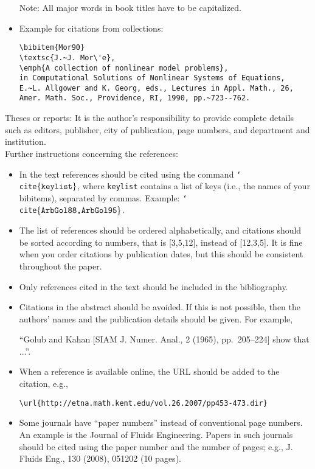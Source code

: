 \documentclass[10pt]{article}
\begin{document}
\begin{itemize}
Note: All major words in book titles have to be capitalized.


\item Example for citations from collections:

\begin{verbatim}
\bibitem{Mor90}
\textsc{J.~J. Mor\'e},
\emph{A collection of nonlinear model problems},
in Computational Solutions of Nonlinear Systems of Equations,
E.~L. Allgower and K. Georg, eds., Lectures in Appl. Math., 26,
Amer. Math. Soc., Providence, RI, 1990, pp.~723--762.
\end{verbatim}

\end{itemize}

\noindent Theses or reports: It is the author's responsibility to provide
complete details such as editors, publisher, city of publication, page
numbers, and department and institution.\\

\noindent Further instructions concerning the references:

\begin{itemize}
\item In the text references should be cited using the command
{\tt \char`\\cite$\{\mbox{\tt keylist}\}$},
where {\tt keylist} contains a list of keys (i.e., the names of your bibitems),
separated by commas. Example:
{\tt \char`\\cite$\{\mbox{\tt ArbGol88,ArbGol95}\}$}.
%
\item The list of references should be ordered alphabetically, and
citations should be sorted according to numbers, that is [3,5,12],
instead of [12,3,5]. It is fine when you order citations by publication
dates, but this should be consistent throughout the paper.
%
\item Only references cited in the text should be included in the bibliography.
%
\item Citations in the abstract should be avoided. If this is not possible,
then the authors' names and the publication details should be given. For example,

``Golub and Kahan [SIAM J. Numer. Anal., 2 (1965), pp.~205--224] show that ...''.

\item When a reference is available online, the URL should be added to the citation, e.g.,
%
\begin{verbatim}
\url{http://etna.math.kent.edu/vol.26.2007/pp453-473.dir}
\end{verbatim}

\item Some journals have ``paper numbers'' instead of conventional page numbers.
An example is the Journal of Fluids Engineering. Papers in such journals should
be cited using the paper number and the number of pages; e.g.,
J. Fluids Eng., 130 (2008), 051202 (10 pages).


\end{itemize}
\end{document}
